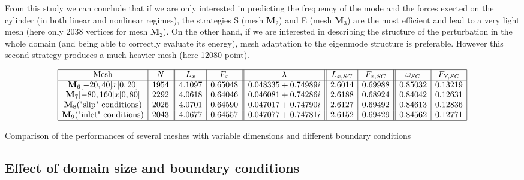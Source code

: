 \documentclass[twocolumn,10pt]{asme2ej}
\begin{document}
From this study we can conclude that if we are only interested in predicting the frequency of the mode and the forces exerted on the cylinder (in both linear and nonlinear regimes), the strategies S (mesh $\mathbf{M}_2$) and E (mesh $\mathbf{M}_3$) are the most efficient and lead to a very light mesh (here only 2038 vertices for mesh $\mathbf{M}_2$). On the other hand, if we are interested in describing the structure of the perturbation in the whole domain (and being able to correctly evaluate its energy), mesh adaptation to the eigenmode structure is preferable. However this second strategy produces a much heavier mesh (here 12080 point).
 
 
 \begin{table*}
$$
\begin{array}{|c|c||c|c||c||c|c||c|c|}
\hline
\mbox{Mesh} & N & L_x & F_x & \lambda & L_{x,SC} & F_{x,SC} & \omega_{SC}  & F_{Y,SC} \\%
\hline
\mathbf{M}_6 [-20,40]x[0,20] 			& 1954	&  4.1097 & 0.65048 	& 0.048335+0.74989i 	& 2.6014  & 0.69988 & 0.85032 & 0.13219 \\%
\mathbf{M}_7 [-80,160]x[0,80] 			& 2292	& 4.0618 & 0.64046		& 0.046081+0.74286i 	& 2.6188 	& 0.68924 	& 0.84042 & 0.12631 \\%
\mathbf{M}_8 \mbox{("slip" conditions)}	 & 2026	& 4.0701 &0.64590		& 0.047017+0.74790i	& 2.6127 	& 0.69492		& 0.84613 & 0.12836 \\%
\mathbf{M}_9 \mbox{("inlet" conditions)}	 & 2043	& 4.0677 &0.64	557	& 0.047077+0.74781i	& 2.6152 	& 0.69429		& 0.84562  & 0.12771 \\%
\hline
\end{array}
$$
\caption{Comparison of the performances of several meshes with variable dimensions and different boundary conditions}
\label{tab:conv3}
\end{table*}






\subsection{Effect of domain size and boundary conditions}
\end{document}
